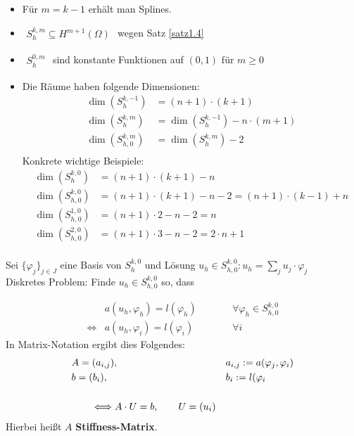 \begin{bemerkung}\
\begin{itemize}
\item Für $m=k-1$ erhält man Splines.
\item $\begin{aligned}
S_h^{k,m}\subseteq H^{m+1}(\Omega)
\end{aligned}$ wegen Satz \ref{satz1.4}
\item $\begin{aligned}
S_h^{0,m}
\end{aligned}$ sind konstante Funktionen auf $(0,1)$ für $m\geq0$
\item Die Räume haben folgende Dimensionen:
\begin{align*}
\dim\left(S_h^{k,-1}\right)&=(n+1)\cdot(k+1)\\
\dim\left(S_h^{k,m}\right)&=\dim\left(S_h^{k,-1}\right)-n\cdot(m+1)\\
\dim\left(S_{h,0}^{k,m}\right)&=\dim\left(S_h^{k,m}\right)-2\\
\end{align*}
Konkrete wichtige Beispiele:
\begin{align*}
\dim\left(S_h^{k,0}\right)&=(n+1)\cdot(k+1)-n\\
\dim\left(S_{h,0}^{k,0}\right)&=(n+1)\cdot(k+1)-n-2=(n+1)\cdot(k-1)+n\\
\dim\left(S_{h,0}^{1,0}\right)&=(n+1)\cdot 2-n-2=n\\
\dim\left(S_{h,0}^{2,0}\right)&=(n+1)\cdot 3-n-2=2\cdot n+1\\
\end{align*}
\end{itemize}
\end{bemerkung}
Sei $\lbrace\varphi_j\rbrace_{j\in J}$ eine Basis von $S_h^{k,0}$
und Lösung $u_h\in S_{h,0}^{k,0}: u_h=\sum\limits_j u_j\cdot\varphi_j$\\
Diskretes Problem: Finde $u_h\in S_{h,0}^{k,0}$ so, dass 

\begin{align*}
	&a(u_h,\varphi_h)=l(\varphi_h)&\qquad&\forall \varphi_h\in S_{h,0}^{k,0}\\
	\Longleftrightarrow &a(u_h,\varphi_i)=l(\varphi_i)&\qquad&\forall i
\end{align*}
In Matrix-Notation ergibt dies Folgendes:
\begin{align*}
	&A=(a_{i,j}),&&a_{i,j}:=a(\varphi_j,\varphi_i)\\
	&b=(b_i),&&b_i:=l(\varphi_i\nl
	&\qquad\Longleftrightarrow A\cdot U=b,\qquad U=(u_i)
\end{align*}
Hierbei heißt $A$ \textbf{Stiffness-Matrix}.

